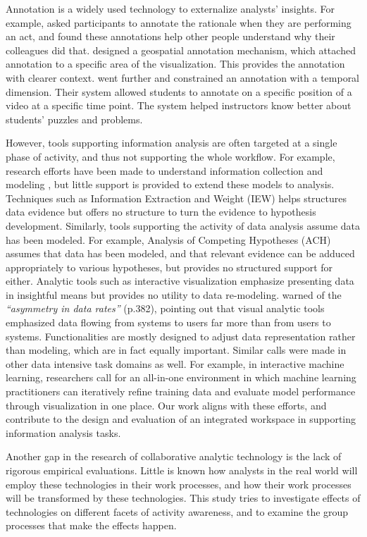 Annotation is a widely used technology to externalize analysts’ insights. For example, \cite{Xiao2008c} asked participants to annotate the rationale when they are performing an act, and found these annotations help other people understand why their colleagues did that. \cite{Hopfer2007b} designed a geospatial annotation mechanism, which attached annotation to a specific area of the visualization. This provides the annotation with clearer context. \cite{Dorn2015a} went further and constrained an annotation with a temporal dimension. Their system allowed students to annotate on a specific position of a video at a specific time point. The system helped instructors know better about students’ puzzles and problems. 

However, tools supporting information analysis are often targeted at a single phase of activity, and thus not supporting the whole workflow. For example, research efforts have been made to understand information collection and modeling \citep{Shah2014i, Jansen2010c}, but little support is provided to extend these models to analysis. Techniques such as Information Extraction and Weight (IEW) helps structures data evidence but offers no structure to turn the evidence to hypothesis development. Similarly, tools supporting the activity of data analysis assume data has been modeled. For example,  Analysis of Competing Hypotheses (ACH) assumes that data has
been modeled, and that relevant evidence can be adduced appropriately to various
hypotheses, but provides no structured support for either. Analytic tools such as interactive visualization emphasize presenting data in insightful means but provides no utility to data re-modeling.
\cite{Ware2012} warned of the \emph{``asymmetry in data rates''} (p.382),
pointing out that visual analytic tools emphasized data flowing from systems to
users far more than from users to systems. Functionalities are mostly designed
to adjust data representation rather than modeling, which are in fact equally
important. Similar calls were made in other data intensive task domains as well. For
example, in interactive machine learning, researchers \citep{Chen2016,Amershi2015} call for an all-in-one environment in which machine learning
practitioners can iteratively refine training data and evaluate model performance through
visualization in one place. Our work aligns with these efforts, and contribute to the design and
evaluation of an integrated workspace in supporting information analysis tasks.

Another gap in the research of collaborative analytic technology is the lack of rigorous empirical evaluations. Little is known how analysts in the real world will employ these technologies in their work processes, and how their work processes will be transformed by these technologies. This study tries to investigate effects of technologies on different facets of activity awareness, and to examine the group processes that make the effects happen.